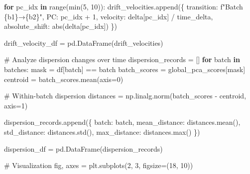 \documentclass[
  letterpaper,
  DIV=11,
  numbers=noendperiod]{scrartcl}
\newenvironment{Shaded}{\begin{snugshade}}{\end{snugshade}}
\newcommand{\BuiltInTok}[1]{\textcolor[rgb]{0.00,0.23,0.31}{#1}}
\newcommand{\CommentTok}[1]{\textcolor[rgb]{0.37,0.37,0.37}{#1}}
\newcommand{\ControlFlowTok}[1]{\textcolor[rgb]{0.00,0.23,0.31}{\textbf{#1}}}
\newcommand{\DecValTok}[1]{\textcolor[rgb]{0.68,0.00,0.00}{#1}}
\newcommand{\KeywordTok}[1]{\textcolor[rgb]{0.00,0.23,0.31}{\textbf{#1}}}
\newcommand{\NormalTok}[1]{\textcolor[rgb]{0.00,0.23,0.31}{#1}}
\newcommand{\OperatorTok}[1]{\textcolor[rgb]{0.37,0.37,0.37}{#1}}
\newcommand{\SpecialCharTok}[1]{\textcolor[rgb]{0.37,0.37,0.37}{#1}}
\newcommand{\SpecialStringTok}[1]{\textcolor[rgb]{0.13,0.47,0.30}{#1}}
\newcommand{\StringTok}[1]{\textcolor[rgb]{0.13,0.47,0.30}{#1}}
\renewenvironment{Shaded}{%
  \begin{tcolorbox}[%
    enhanced,%
    colback=codebg,%
    colframe=codebg,%
    borderline west={3pt}{0pt}{sectionblue},%
    fontupper=\small\ttfamily,%
    boxrule=0pt,%
    arc=0pt,%
    boxsep=5pt,%
    left=2mm,%
    right=2mm,%
    top=2mm,%
    bottom=2mm%
  ]%
}{%
  \end{tcolorbox}%
}
\begin{document}
\begin{Shaded}
\begin{Highlighting}[]
    \ControlFlowTok{for}\NormalTok{ pc\_idx }\KeywordTok{in} \BuiltInTok{range}\NormalTok{(}\BuiltInTok{min}\NormalTok{(}\DecValTok{5}\NormalTok{, }\DecValTok{10}\NormalTok{)):}
\NormalTok{        drift\_velocities.append(\{}
            \StringTok{\textquotesingle{}transition\textquotesingle{}}\NormalTok{: }\SpecialStringTok{f"Batch }\SpecialCharTok{\{}\NormalTok{b1}\SpecialCharTok{\}}\SpecialStringTok{→}\SpecialCharTok{\{}\NormalTok{b2}\SpecialCharTok{\}}\SpecialStringTok{"}\NormalTok{,}
            \StringTok{\textquotesingle{}PC\textquotesingle{}}\NormalTok{: pc\_idx }\OperatorTok{+} \DecValTok{1}\NormalTok{,}
            \StringTok{\textquotesingle{}velocity\textquotesingle{}}\NormalTok{: delta[pc\_idx] }\OperatorTok{/}\NormalTok{ time\_delta,}
            \StringTok{\textquotesingle{}absolute\_shift\textquotesingle{}}\NormalTok{: }\BuiltInTok{abs}\NormalTok{(delta[pc\_idx])}
\NormalTok{        \})}

\NormalTok{drift\_velocity\_df }\OperatorTok{=}\NormalTok{ pd.DataFrame(drift\_velocities)}

\CommentTok{\# Analyze dispersion changes over time}
\NormalTok{dispersion\_records }\OperatorTok{=}\NormalTok{ []}
\ControlFlowTok{for}\NormalTok{ batch }\KeywordTok{in}\NormalTok{ batches:}
\NormalTok{    mask }\OperatorTok{=}\NormalTok{ df[}\StringTok{\textquotesingle{}batch\textquotesingle{}}\NormalTok{] }\OperatorTok{==}\NormalTok{ batch}
\NormalTok{    batch\_scores }\OperatorTok{=}\NormalTok{ global\_pca\_scores[mask]}
\NormalTok{    centroid }\OperatorTok{=}\NormalTok{ batch\_scores.mean(axis}\OperatorTok{=}\DecValTok{0}\NormalTok{)}
    
    \CommentTok{\# Within{-}batch dispersion}
\NormalTok{    distances }\OperatorTok{=}\NormalTok{ np.linalg.norm(batch\_scores }\OperatorTok{{-}}\NormalTok{ centroid, axis}\OperatorTok{=}\DecValTok{1}\NormalTok{)}
    
\NormalTok{    dispersion\_records.append(\{}
        \StringTok{\textquotesingle{}batch\textquotesingle{}}\NormalTok{: batch,}
        \StringTok{\textquotesingle{}mean\_distance\textquotesingle{}}\NormalTok{: distances.mean(),}
        \StringTok{\textquotesingle{}std\_distance\textquotesingle{}}\NormalTok{: distances.std(),}
        \StringTok{\textquotesingle{}max\_distance\textquotesingle{}}\NormalTok{: distances.}\BuiltInTok{max}\NormalTok{()}
\NormalTok{    \})}

\NormalTok{dispersion\_df }\OperatorTok{=}\NormalTok{ pd.DataFrame(dispersion\_records)}

\CommentTok{\# Visualization}
\NormalTok{fig, axes }\OperatorTok{=}\NormalTok{ plt.subplots(}\DecValTok{2}\NormalTok{, }\DecValTok{3}\NormalTok{, figsize}\OperatorTok{=}\NormalTok{(}\DecValTok{18}\NormalTok{, }\DecValTok{10}\NormalTok{))}


\end{Highlighting}
\end{Shaded}
\end{document}
